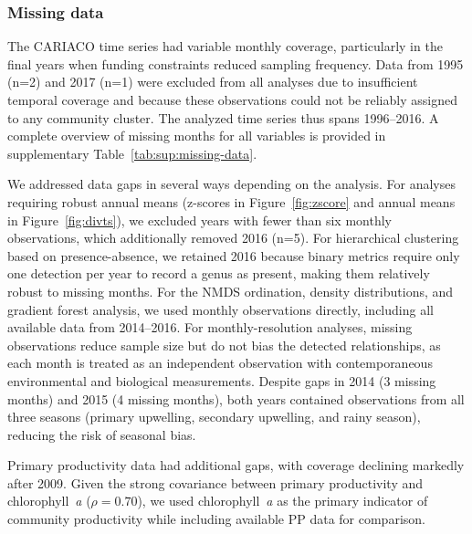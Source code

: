 \documentclass[]{agujournal2019}
\begin{document}
    \subsubsection{Missing data}
         The CARIACO time series had variable monthly coverage, particularly in the final years when funding constraints reduced sampling frequency. Data from 1995 (n=2) and 2017 (n=1) were excluded from all analyses due to insufficient temporal coverage and because these observations could not be reliably assigned to any community cluster. The analyzed time series thus spans 1996–2016. A complete overview of missing months for all variables is provided in supplementary Table~\ref{tab:sup:missing-data}.
    
        We addressed data gaps in several ways depending on the analysis. For analyses requiring robust annual means (z-scores in Figure~\ref{fig:zscore} and annual means in Figure~\ref{fig:divts}), we excluded years with fewer than six monthly observations, which additionally removed 2016 (n=5). For hierarchical clustering based on presence-absence, we retained 2016 because binary metrics require only one detection per year to record a genus as present, making them relatively robust to missing months. For the NMDS ordination, density distributions, and gradient forest analysis, we used monthly observations directly, including all available data from 2014–2016. For monthly-resolution analyses, missing observations reduce sample size but do not bias the detected relationships, as each month is treated as an independent observation with contemporaneous environmental and biological measurements. Despite gaps in 2014 (3 missing months) and 2015 (4 missing months), both years contained observations from all three seasons (primary upwelling, secondary upwelling, and rainy season), reducing the risk of seasonal bias.
    
        Primary productivity data had additional gaps, with coverage declining markedly after 2009. Given the strong covariance between primary productivity and chlorophyll~\textit{a} ($\rho = 0.70$), we used chlorophyll~\textit{a} as the primary indicator of community productivity while including available PP data for comparison.
    
\end{document}
